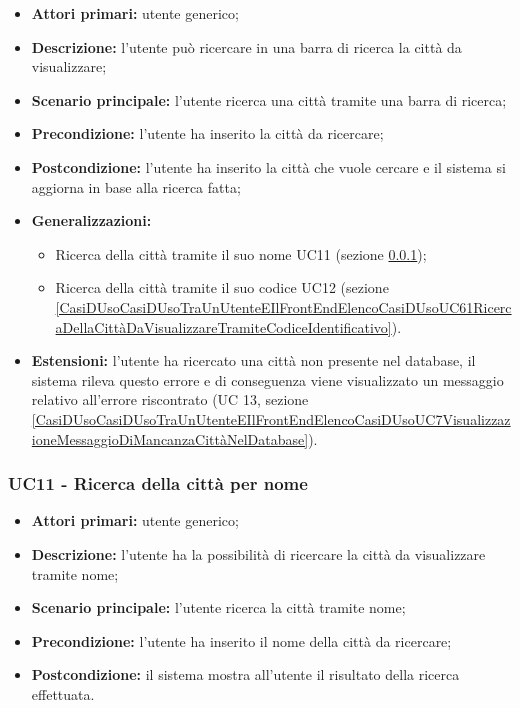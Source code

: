 \begin{itemize}
	\item \textbf{Attori primari:} utente generico;
	\item \textbf{Descrizione:} l’utente può ricercare in una barra di ricerca la città da visualizzare;
	\item \textbf{Scenario principale:} l’utente ricerca una città tramite una barra di ricerca;
	\item \textbf{Precondizione:} l’utente ha inserito la città da ricercare;
	\item \textbf{Postcondizione:} l’utente ha inserito la città che vuole cercare e il sistema si aggiorna in base alla ricerca fatta;
	\item \textbf{Generalizzazioni:}
	\begin{itemize}
		\item Ricerca della città tramite il suo nome UC11 (sezione \ref{CasiDUsoCasiDUsoTraUnUtenteEIlFrontEndElencoCasiDUsoUC52RicercaDellaCittàDaVisualizzareTramiteNome});
		\item Ricerca della città tramite il suo codice UC12 (sezione \ref{CasiDUsoCasiDUsoTraUnUtenteEIlFrontEndElencoCasiDUsoUC61RicercaDellaCittàDaVisualizzareTramiteCodiceIdentificativo}).
	\end{itemize}
	\item \textbf{Estensioni:} l’utente ha ricercato una città non presente nel database, il sistema rileva questo errore e di conseguenza viene visualizzato un messaggio relativo all’errore riscontrato (UC 13, sezione \ref{CasiDUsoCasiDUsoTraUnUtenteEIlFrontEndElencoCasiDUsoUC7VisualizzazioneMessaggioDiMancanzaCittàNelDatabase}).
\end{itemize}


\subsubsection{UC11 - Ricerca della città per nome}\label{CasiDUsoCasiDUsoTraUnUtenteEIlFrontEndElencoCasiDUsoUC52RicercaDellaCittàDaVisualizzareTramiteNome}

\begin{itemize}
	\item \textbf{Attori primari:} utente generico;
	\item \textbf{Descrizione:} l’utente ha la possibilità di ricercare la città da visualizzare tramite nome;
	\item \textbf{Scenario principale:} l’utente ricerca la città tramite nome;
	\item \textbf{Precondizione:} l’utente ha inserito il nome della città da ricercare;
	\item \textbf{Postcondizione:} il sistema mostra all’utente il risultato della ricerca effettuata.
\end{itemize}

